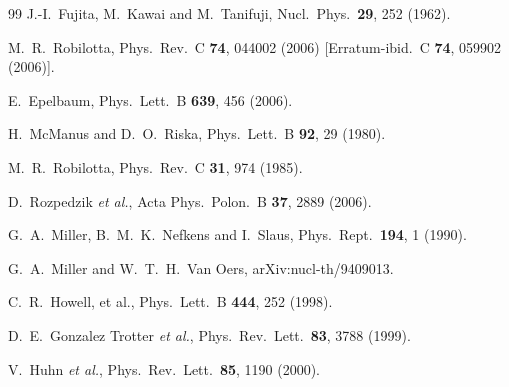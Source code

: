 \documentclass[aps,rmp,nofootinbib,twocolumn,floatfix]{revtex4}
\begin{document}
\begin{thebibliography}{99}
  J.-I.~Fujita, M.~Kawai and M.~Tanifuji,
  Nucl.\ Phys.\  {\bf 29}, 252 (1962).

  M.~R.~Robilotta,
  Phys.\ Rev.\  C {\bf 74}, 044002 (2006)
  [Erratum-ibid.\  C {\bf 74}, 059902 (2006)].

  E.~Epelbaum,
  Phys.\ Lett.\  B {\bf 639}, 456 (2006).

  H.~McManus and D.~O.~Riska,
  Phys.\ Lett.\  B {\bf 92}, 29 (1980).

  M.~R.~Robilotta,
  Phys.\ Rev.\  C {\bf 31}, 974 (1985).

  D.~Rozpedzik {\it et al.},
  Acta Phys.\ Polon.\  B {\bf 37}, 2889 (2006).

  G.~A.~Miller, B.~M.~K.~Nefkens and I.~Slaus,
  Phys.\ Rept.\  {\bf 194}, 1 (1990).

  G.~A.~Miller and W.~T.~H.~Van Oers,
  arXiv:nucl-th/9409013.


  C.~R.~Howell, et al.,
  Phys.\ Lett.\  B {\bf 444}, 252 (1998).

  D.~E.~Gonzalez Trotter {\it et al.},
  Phys.\ Rev.\ Lett.\  {\bf 83}, 3788 (1999).

  V.~Huhn {\it et al.},
  Phys.\ Rev.\ Lett.\  {\bf 85}, 1190 (2000).


\end{thebibliography}
\end{document}
